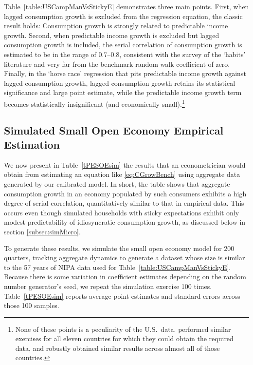 Table~\ref{table:USCampManVsStickyE} demonstrates three main points.  First, when lagged consumption growth is excluded from the regression equation, the classic \cite{cmModel} result holds: Consumption growth is strongly related to predictable income growth.  Second, when predictable income growth is excluded but lagged consumption growth is included, the serial correlation of consumption growth is estimated to be in the range of 0.7--0.8, consistent with the \cite{hrsHabit} survey of the `habits' literature and very far from the benchmark random walk coefficient of zero.  Finally, in the `horse race' regression that pits predictable income growth against lagged consumption growth, lagged consumption growth retains its statistical significance and large point estimate, while the predictable income growth term becomes statistically insignificant (and economically small).\footnote{None of these points is a peculiarity of the U.S.\ data.  \cite{cssIntlStickyC} performed similar exercises for all eleven countries for which they could obtain the required data, and robustly obtained similar results across almost all of those countries.}


\subsection{Simulated Small Open Economy Empirical Estimation}
\label{subsec:SOEResults}

We now present in Table~\ref{tPESOEsim} the results that an econometrician would obtain from estimating an equation like \eqref{eq:CGrowBench} using aggregate data generated by our calibrated model.  In short, the table shows that aggregate consumption growth in an economy populated by such consumers exhibits a high degree of serial correlation, quantitatively similar to that in empirical data.  This occurs even though simulated households with sticky expectations exhibit only modest predictability of idiosyncratic consumption growth, as discussed below in section \ref{subsec:simMicro}.

To generate these results, we simulate the small open economy model for 200 quarters, tracking aggregate dynamics to generate a dataset whose size is similar to the 57 years of NIPA data used for Table~\ref{table:USCampManVsStickyE}.  Because there is some variation in coefficient estimates depending on the random number generator's seed, we repeat the simulation exercise 100 times.  Table~\ref{tPESOEsim} reports average point estimates and standard errors across those 100 samples.

